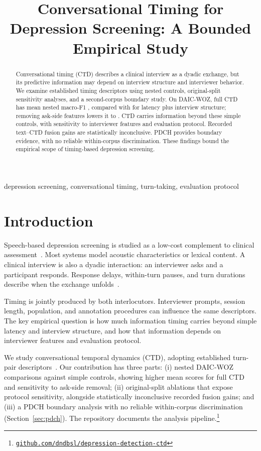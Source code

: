 \documentclass{article}
\title{Conversational Timing for Depression Screening: A Bounded Empirical Study}
\begin{document}
\maketitle
\begin{abstract}
Conversational timing (CTD) describes a clinical interview as a dyadic exchange, but its predictive information may depend on interview structure and interviewer behavior. We examine established timing descriptors using nested controls, original-split sensitivity analyses, and a second-corpus boundary study. On DAIC-WOZ, full CTD has mean nested macro-F1 , compared with  for latency plus interview structure; removing ask-side features lowers it to . CTD carries information beyond these simple controls, with sensitivity to interviewer features and evaluation protocol. Recorded text--CTD fusion gains are statistically inconclusive. PDCH provides boundary evidence, with no reliable within-corpus discrimination. These findings bound the empirical scope of timing-based depression screening.
\end{abstract}
\begin{keywords}
depression screening, conversational timing, turn-taking, evaluation protocol
\end{keywords}

\section{Introduction}
Speech-based depression screening is studied as a low-cost complement to clinical assessment~\cite{valstar2016avec,cummins2015review}. Most systems model acoustic characteristics or lexical content. A clinical interview is also a dyadic interaction: an interviewer asks and a participant responds. Response delays, within-turn pauses, and turn durations describe when the exchange unfolds~\cite{yamamoto2020timing,aldeneh2019mood}.

Timing is jointly produced by both interlocutors. Interviewer prompts, session length, population, and annotation procedures can influence the same descriptors. The key empirical question is how much information timing carries beyond simple latency and interview structure, and how that information depends on interviewer features and evaluation protocol.

We study conversational temporal dynamics (CTD), adopting  established turn-pair descriptors~\cite{chou2019joint,chou2021automatic}. Our contribution has three parts: (i) nested DAIC-WOZ comparisons against simple controls, showing higher mean scores for full CTD and sensitivity to ask-side removal; (ii) original-split ablations that expose protocol sensitivity, alongside statistically inconclusive recorded fusion gains; and (iii) a PDCH boundary analysis with no reliable within-corpus discrimination (Section~\ref{sec:pdch}). The repository documents the analysis pipeline.\footnote{\small\href{https://github.com/dndbsl/depression-detection-ctd}{\nolinkurl{github.com/dndbsl/depression-detection-ctd}}}
\end{document}
